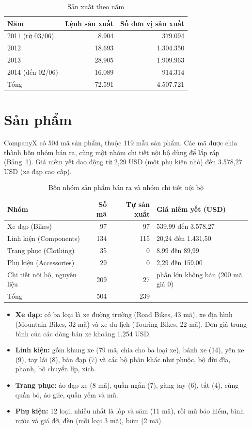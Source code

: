 \documentclass[11pt,a4paper]{article}
\begin{document}
\begin{table}[H]
\centering
\small
\begin{tabular}{lrr}
\toprule
Năm & Lệnh sản xuất & Số đơn vị sản xuất \\
\midrule
2011 (từ 03/06) & 8.904 & 379.094 \\
2012 & 18.693 & 1.304.350 \\
2013 & 28.905 & 1.909.963 \\
2014 (đến 02/06) & 16.089 & 914.314 \\
\midrule
Tổng & 72.591 & 4.507.721 \\
\bottomrule
\end{tabular}
\caption{Sản xuất theo năm}
\end{table}

\section{Sản phẩm}
CompanyX có 504 mã sản phẩm, thuộc 119 mẫu sản phẩm. Các mã được chia thành bốn nhóm bán ra, cùng một nhóm chi tiết nội bộ dùng để lắp ráp (Bảng~\ref{tab:nhom}). Giá niêm yết dao động từ 2,29 USD (một phụ kiện nhỏ) đến 3.578,27 USD (xe đạp cao cấp).

\begin{table}[H]
\centering
\small
\begin{tabular}{p{4.3cm}rrp{4.6cm}}
\toprule
Nhóm & Số mã & Tự sản xuất & Giá niêm yết (USD) \\
\midrule
Xe đạp (Bikes) & 97 & 97 & 539,99 đến 3.578,27 \\
Linh kiện (Components) & 134 & 115 & 20,24 đến 1.431,50 \\
Trang phục (Clothing) & 35 & 0 & 8,99 đến 89,99 \\
Phụ kiện (Accessories) & 29 & 0 & 2,29 đến 159,00 \\
Chi tiết nội bộ, nguyên liệu & 209 & 27 & phần lớn không bán (200 mã giá 0) \\
\midrule
Tổng & 504 & 239 & \\
\bottomrule
\end{tabular}
\caption{Bốn nhóm sản phẩm bán ra và nhóm chi tiết nội bộ}
\label{tab:nhom}
\end{table}

\begin{itemize}
    \item \textbf{Xe đạp:} có ba loại là xe đường trường (Road Bikes, 43 mã), xe địa hình (Mountain Bikes, 32 mã) và xe du lịch (Touring Bikes, 22 mã). Đơn giá trung bình của các dòng bán xe khoảng 1.254 USD.
    \item \textbf{Linh kiện:} gồm khung xe (79 mã, chia cho ba loại xe), bánh xe (14), yên xe (9), tay lái (8), bàn đạp (7) và các bộ phận khác như phuộc, bộ đùi đĩa, phanh, bộ chuyển líp, xích.
    \item \textbf{Trang phục:} áo đạp xe (8 mã), quần ngắn (7), găng tay (6), tất (4), cùng quần bó, áo gile, quần yếm và mũ.
    \item \textbf{Phụ kiện:} 12 loại, nhiều nhất là lốp và săm (11 mã), rồi mũ bảo hiểm, bình nước và giá đỡ, đèn (mỗi loại 3 mã), bơm (2 mã).
\end{itemize}
\end{document}

